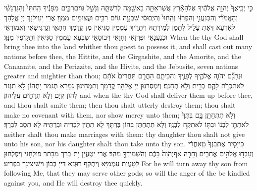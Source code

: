 \newperek
{}%
{כִּ֤י יְבִֽיאֲךָ֙ יְהֹוָ֣ה אֱלֹהֶ֔יךָ אֶל\maqqaf הָאָ֕רֶץ אֲשֶׁר\maqqaf אַתָּ֥ה בָא\maqqaf שָׁ֖מָּה לְרִשְׁתָּ֑הּ וְנָשַׁ֣ל גּֽוֹיִם\maqqaf רַבִּ֣ים \pasek  מִפָּנֶ֡יךָ הַֽחִתִּי֩ וְהַגִּרְגָּשִׁ֨י וְהָאֱמֹרִ֜י וְהַכְּנַעֲנִ֣י וְהַפְּרִזִּ֗י וְהַֽחִוִּי֙ וְהַיְבוּסִ֔י שִׁבְעָ֣ה גוֹיִ֔ם רַבִּ֥ים וַעֲצוּמִ֖ים מִמֶּֽךָּ׃}
{אֲרֵי יַעֵילִנָּךְ יְיָ אֱלָהָךְ לְאַרְעָא דְּאַתְּ עָלֵיל לְתַמָּן לְמֵירְתַהּ וִיתָרֵיךְ עַמְמִין סַגִּיאִין מִן קֳדָמָךְ חִתָּאֵי וְגַרְגִּישָׁאֵי וֶאֱמוֹרָאֵי וּכְנַעֲנָאֵי וּפְרִזָּאֵי וְחִוָּאֵי וִיבוּסָאֵי שִׁבְעָא עַמְמִין סַגִּיאִין וְתַקִּיפִין מִנָּךְ׃}
{When the \lord\space thy God shall bring thee into the land whither thou goest to possess it, and shall cast out many nations before thee, the Hittite, and the Girgashite, and the Amorite, and the Canaanite, and the Perizzite, and the Hivite, and the Jebusite, seven nations greater and mightier than thou;}{}
{וּנְתָנָ֞ם יְהֹוָ֧ה אֱלֹהֶ֛יךָ לְפָנֶ֖יךָ וְהִכִּיתָ֑ם הַחֲרֵ֤ם תַּחֲרִים֙ אֹתָ֔ם לֹא\maqqaf תִכְרֹ֥ת לָהֶ֛ם בְּרִ֖ית וְלֹ֥א תְחׇנֵּֽם׃}
{וְיִמְסְרִנּוּן יְיָ אֱלָהָךְ קֳדָמָךְ וְתִמְחֵינוּן גַּמָּרָא תְגַּמַּר יָתְהוֹן לָא תִגְזַר לְהוֹן קְיָם וְלָא תְרַחֵים עֲלֵיהוֹן׃}
{and when the \lord\space thy God shall deliver them up before thee, and thou shalt smite them; then thou shalt utterly destroy them; thou shalt make no covenant with them, nor show mercy unto them;}{}
{וְלֹ֥א תִתְחַתֵּ֖ן בָּ֑ם בִּתְּךָ֙ לֹא\maqqaf תִתֵּ֣ן לִבְנ֔וֹ וּבִתּ֖וֹ לֹא\maqqaf תִקַּ֥ח לִבְנֶֽךָ׃}
{וְלָא תִתְחַתַּן בְּהוֹן בְּרַתָּךְ לָא תִתֵּין לִבְרֵיהּ וּבְרַתֵּיהּ לָא תִסַּב לִבְרָךְ׃}
{neither shalt thou make marriages with them: thy daughter thou shalt not give unto his son, nor his daughter shalt thou take unto thy son.}{}
{כִּֽי\maqqaf יָסִ֤יר אֶת\maqqaf בִּנְךָ֙ מֵֽאַחֲרַ֔י וְעָבְד֖וּ אֱלֹהִ֣ים אֲחֵרִ֑ים וְחָרָ֤ה אַף\maqqaf יְהֹוָה֙ בָּכֶ֔ם וְהִשְׁמִידְךָ֖ מַהֵֽר׃}
{אֲרֵי יַטְעֲיָן יָת בְּרָךְ מִבָּתַר פּוּלְחָנִי וְיִפְלְחוּן לְטָעֲוָת עַמְמַיָּא וְיִתְקַף רוּגְזָא דַּייָ בְּכוֹן וִישֵׁיצֵינָךְ בִּפְרִיעַ׃}
{For he will turn away thy son from following Me, that they may serve other gods; so will the anger of the \lord\space be kindled against you, and He will destroy thee quickly.}{}

